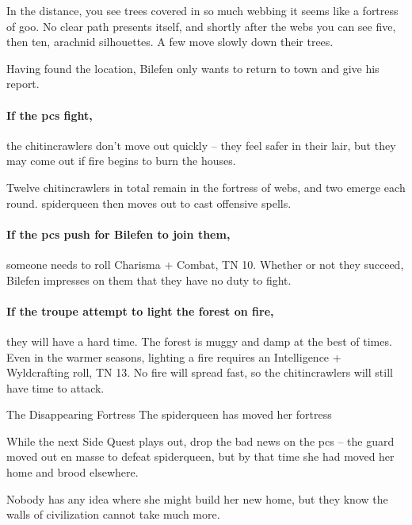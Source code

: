 \begin{boxtext}
  In the distance, you see trees covered in so much webbing it seems like a fortress of goo.
  No clear path presents itself, and shortly after the webs you can see five, then ten, arachnid silhouettes.
  A few move slowly down their trees.
\end{boxtext}

Having found the location, Bilefen only wants to return to \gls{town} and give his report.

\paragraph{If the \glspl{pc} fight,}
the chitincrawlers don't move out quickly -- they feel safer in their lair, but they may come out if fire begins to burn the houses.

Twelve chitincrawlers in total remain in the fortress of webs, and two emerge each round.
\Gls{spiderqueen} then moves out to cast offensive spells.

\paragraph{If the \glspl{pc} push for Bilefen to join them,}
someone needs to roll Charisma + Combat, TN 10.
Whether or not they succeed, Bilefen impresses on them that they have no duty to fight.


\paragraph{If the troupe attempt to light the forest on fire,}
they will have a hard time.
The forest is muggy and damp at the best of times.
Even in the warmer seasons, lighting a fire requires an Intelligence + Wyldcrafting roll, TN 13.
No fire will spread fast, so the chitincrawlers will still have time to attack.

{\squash The Disappearing Fortress}%
{The \gls{spiderqueen} has moved her fortress}%

While the next Side Quest plays out, drop the bad news on the \glspl{pc} -- the \gls{guard} moved out en masse to defeat \gls{spiderqueen}, but by that time she had moved her home and brood elsewhere.

Nobody has any idea where she might build her new home, but they know the walls of civilization cannot take much more.

